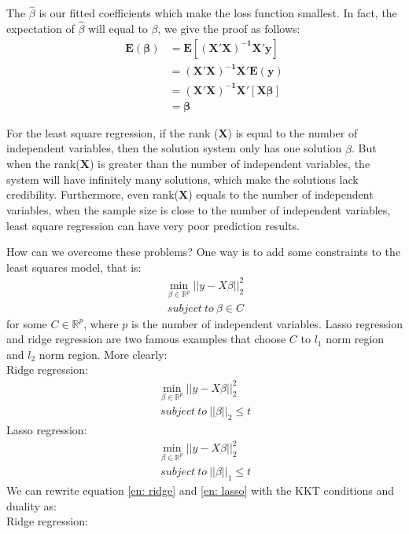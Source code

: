 The $\hat{\beta}$ is our fitted coefficients which make the loss function smallest. In fact, the expectation of $\hat{\beta}$ will equal to $\beta$,  we give the proof as follows: 
\begin{equation}
\begin{aligned}
\bm{E(\beta)}&=\bm{E[(X'X)^{-1}X'y]}\\
&=\bm{(X'X)^{-1}X'E(y)}\\
&=\bm{(X'X)^{-1}X'[X\beta]}\\
&=\bm{\beta}
\end{aligned}
\end{equation}
	
For the least square regression,  if the rank ($\bm{X}$) is equal to the number of independent variables,  then the solution system only has one solution $\hat{\beta}$. But when the rank($\bm{X}$) is greater than the number of independent variables,  the system will have infinitely many solutions,  which make the solutions lack credibility. Furthermore, even rank($\bm{X}$) equals to the number of independent variables,  when the sample size is close to the number of independent variables,  least square regression can have very poor prediction results. 

How can we overcome these problems? One way is to add some constraints to the least squares model,  that is: 
\begin{equation}
\begin{aligned}
\min_{\beta\in \mathbb{R}^p}||y-X\beta||_{2}^{2}\\
\ subject\ to\ \beta\in C
\end{aligned}
\end{equation}
for some $C\in \mathbb{R}^p$,  where $p$ is the number of independent variables. Lasso regression and ridge regression are two famous examples that choose $C$ to $l_1$ norm region and $l_2$ norm region. More clearly: \\
Ridge regression: 
\begin{equation}\label{en: ridge}
\begin{aligned}
\min_{\beta\in \mathbb{R}^p}||y-X\beta||_{2}^{2}\\
\    subject\ to\ ||\beta||_2\leq t 
\end{aligned}
\end{equation}
Lasso regression: 
\begin{equation}\label{en: lasso}
\begin{aligned}
\min_{\beta\in \mathbb{R}^p}||y-X\beta||_{2}^{2}\\
\    subject\ to\ ||\beta||_1\leq t
\end{aligned} 
\end{equation}
We can rewrite equation \ref{en: ridge} and \ref{en: lasso} with the KKT conditions and duality as: \\
Ridge regression: 

